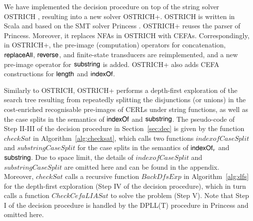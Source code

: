
We have implemented the decision procedure on top of the string solver OSTRICH \cite{CHL+19}, resulting into a new solver OSTRICH+. OSTRICH is  written in Scala and based on the SMT solver Princess \cite{princess08}. 
OSTRICH+ reuses the parser of Princess. Moreover, it replaces NFAs in OSTRICH with CEFAs. Correspondingly, in OSTRICH+, the pre-image  (computation) operators for concatenation, $\mathsf{replaceAll}$, $\mathsf{reverse}$, and finite-state transducers are reimplemented, and a new pre-image operator for $\mathsf{substring}$ is added. OSTRICH+ also adds CEFA constructions for $\mathsf{length}$ and $\mathsf{indexOf}$.  

Similarly to OSTRICH, OSTRICH+ performs a depth-first exploration of the search tree resulting from repeatedly
splitting the disjunctions (or unions) in the cost-enriched recognisable pre-images of CERLs under string functions, as well as the case splits in the semantics of $\mathsf{indexOf}$ and $\mathsf{substring}$.
The pseudo-code of Step II-III of the decision procedure in Section~\ref{sec:dec} is given by  the function $\mathit{checkSat}$ in Algorithm~\ref{alg:checksat}, which calls two functions $\mathit{indexofCaseSplit}$ and $\mathit{substringCaseSplit}$ for the case splits in the semantics of $\mathsf{indexOf}_v$ and $\mathsf{substring}$. Due to space limit, the details of $\mathit{indexofCaseSplit}$ and $\mathit{substringCaseSplit}$ are omitted here and can be found in the appendix. Moreover,  $\mathit{checkSat}$ calls a recursive function  $\mathit{BackDfsExp}$ in Algorithm~\ref{alg:dfs} for the depth-first exploration (Step IV of the decision procedure), which in turn calls a function $\mathit{CheckCefaLIASat}$ to solve the {\lasat} problem (Step V). Note that Step I of the decision procedure is handled by the DPLL(T) procedure in Princess and omitted here. 

